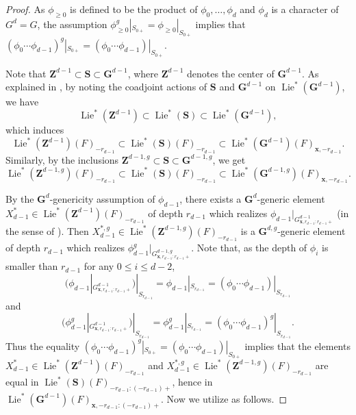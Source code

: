 \documentclass{amsart}
\newcommand{\x}{\mathbf{x}}
\newcommand{\bfG}{\mathbf{G}}
\newcommand{\bfS}{\mathbf{S}}
\newcommand{\bfZ}{\mathbf{Z}}
\DeclareMathOperator{\Lie}{Lie}
\theoremstyle{plain}
\theoremstyle{definition}
\theoremstyle{remark}
\theoremstyle{theorem}
\begin{document}
\begin{proof}
As $\phi_{\geq0}$ is defined to be the product of $\phi_{0},\ldots,\phi_{d}$ and $\phi_{d}$ is a character of $G^{d}=G$, the assumption $\phi_{\geq0}^{g}|_{S_{0+}}=\phi_{\geq0}|_{S_{0+}}$ implies that $(\phi_{0}\cdots\phi_{d-1})^{g}|_{S_{0+}}=(\phi_{0}\cdots\phi_{d-1})|_{S_{0+}}$.

Note that $\bfZ^{d-1}\subset\bfS\subset\bfG^{d-1}$, where $\bfZ^{d-1}$ denotes the center of $\bfG^{d-1}$.
As explained in \cite[Section 8]{Yu01}, by noting the coadjoint actions of $\bfS$ and $\bfG^{d-1}$ on $\Lie^{\ast}(\bfG^{d-1})$, we have 
\[
\Lie^{\ast}(\bfZ^{d-1})
\subset\Lie^{\ast}(\bfS)
\subset\Lie^{\ast}(\bfG^{d-1}),
\]
which induces
\[
\Lie^{\ast}(\bfZ^{d-1})(F)_{-r_{d-1}}
\subset\Lie^{\ast}(\bfS)(F)_{-r_{d-1}}
\subset\Lie^{\ast}(\bfG^{d-1})(F)_{\x,-r_{d-1}}.
\]
Similarly, by the inclusions $\bfZ^{d-1,g}\subset\bfS\subset\bfG^{d-1,g}$, we get
\[
\Lie^{\ast}(\bfZ^{d-1,g})(F)_{-r_{d-1}}
\subset\Lie^{\ast}(\bfS)(F)_{-r_{d-1}}
\subset\Lie^{\ast}(\bfG^{d-1,g})(F)_{\x,-r_{d-1}}.
\]


By the $\bfG^{d}$-genericity assumption of $\phi_{d-1}$, there exists a $\bfG^{d}$-generic element $X_{d-1}^{\ast}\in\Lie^{\ast}(\bfZ^{d-1})(F)_{-r_{d-1}}$ of depth $r_{d-1}$ which realizes $\phi_{d-1}|_{G^{d-1}_{\x,r_{d-1}:r_{d-1}+}}$ (in the sense of \cite[Section 8]{Yu01}).
Then $X_{d-1}^{\ast,g}\in\Lie^{\ast}(\bfZ^{d-1,g})(F)_{-r_{d-1}}$ is a $\bfG^{d,g}$-generic element of depth $r_{d-1}$ which realizes $\phi^{g}_{d-1}|_{G^{d-1,g}_{\x,r_{d-1}:r_{d-1}+}}$.
Note that, as the depth of $\phi_{i}$ is smaller than $r_{d-1}$ for any $0\leq i\leq d-2$, 
\[
(\phi_{d-1}|_{G^{d-1}_{\x,r_{d-1}:r_{d-1}+}})|_{S_{r_{d-1}}}
=\phi_{d-1}|_{S_{r_{d-1}}}
=(\phi_{0}\cdots\phi_{d-1})|_{S_{r_{d-1}}}
\]
and
\[
(\phi_{d-1}^{g}|_{G^{d-1}_{\x,r_{d-1}:r_{d-1}+}})|_{S_{r_{d-1}}}
=\phi_{d-1}^{g}|_{S_{r_{d-1}}}
=(\phi_{0}\cdots\phi_{d-1})^{g}|_{S_{r_{d-1}}}.
\]
Thus the equality $(\phi_{0}\cdots\phi_{d-1})^{g}|_{S_{0+}}=(\phi_{0}\cdots\phi_{d-1})|_{S_{0+}}$ implies that the elements $X_{d-1}^{\ast}\in\Lie^{\ast}(\bfZ^{d-1})(F)_{-r_{d-1}}$ and $X_{d-1}^{\ast,g}\in\Lie^{\ast}(\bfZ^{d-1,g})(F)_{-r_{d-1}}$ are equal in $\Lie^{\ast}(\bfS)(F)_{-r_{d-1}:(-r_{d-1})+}$, hence in $\Lie^{\ast}(\bfG^{d-1})(F)_{\x,-r_{d-1}:(-r_{d-1})+}$.
Now we utilize \cite[Lemma 8,3]{Yu01} as follows.


\end{proof}
\end{document}
